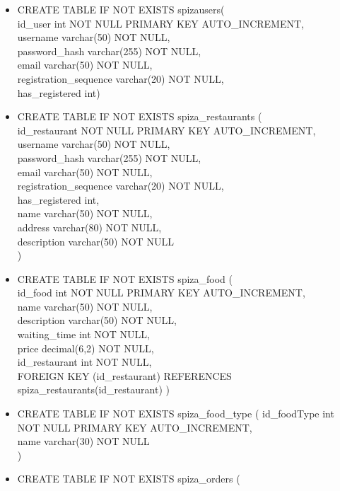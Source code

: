 \documentclass[12pt]{scrartcl}
\begin{document}
\begin{itemize}
 
    \item[] CREATE TABLE IF NOT EXISTS spiza\textunderscore users( \\
    id\_user int NOT NULL PRIMARY KEY AUTO\_INCREMENT,\\
    username varchar(50) NOT NULL,\\
    password\_hash varchar(255) NOT NULL,\\
    email varchar(50) NOT NULL,\\
    registration\_sequence varchar(20) NOT NULL,
    \\has\_registered int)
    \item[] CREATE TABLE IF NOT EXISTS spiza\_restaurants (\\
    id\_restaurant NOT NULL PRIMARY KEY AUTO\_INCREMENT,\\
    username varchar(50) NOT NULL, \\
    password\_hash varchar(255) NOT NULL,\\
    email varchar(50) NOT NULL,\\
    registration\_sequence varchar(20) NOT NULL,\\
    has\_registered int,\\
    name varchar(50) NOT NULL,\\
    address varchar(80) NOT NULL,\\
    description varchar(50) NOT NULL\\
    )
    \item[] CREATE TABLE IF NOT EXISTS spiza\_food (\\
    id\_food int NOT NULL PRIMARY KEY AUTO\_INCREMENT,\\
    name varchar(50) NOT NULL,\\
    description varchar(50) NOT NULL,\\
    waiting\_time int NOT NULL,\\
    price decimal(6,2) NOT NULL,\\
    id\_restaurant int NOT NULL,\\
    FOREIGN KEY (id\_restaurant) REFERENCES spiza\_restaurants(id\_restaurant)
    )
    \item[] CREATE TABLE IF NOT EXISTS spiza\_food\_type (
    id\_foodType int NOT NULL PRIMARY KEY AUTO\_INCREMENT,\\
    name varchar(30) NOT NULL\\
    )
    \item[] CREATE TABLE IF NOT EXISTS spiza\_orders  (\\

\end{itemize}
\end{document}
